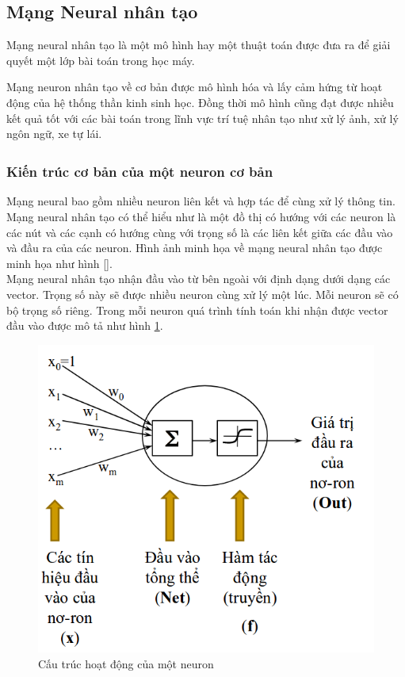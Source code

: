 \documentclass[fontsize=12pt]{scrartcl}
\begin{document}
\subsection{Mạng Neural nhân tạo}\label{subsec:basic_neural}
Mạng neural nhân tạo là một mô hình hay một thuật toán được đưa ra để giải quyết một lớp bài toán trong học máy.
\par
Mạng neuron nhân tạo về cơ bản được mô hình hóa và lấy cảm hứng từ hoạt động của hệ thống thần kinh sinh học. Đồng thời mô hình cũng đạt được nhiều kết quả tốt với các bài toán trong lĩnh vực trí tuệ nhân tạo như xử lý ảnh, xử lý ngôn ngữ, xe tự lái.
\subsubsection{Kiến trúc cơ bản của một neuron cơ bản\textsuperscript{\cite{khoattq}}}\label{subsubsec:basic_neuron}
Mạng neural bao gồm nhiều neuron liên kết và hợp tác để cùng xử lý thông tin. Mạng neural nhân tạo có thể hiểu như là một đồ thị có hướng với các neuron là các nút và các cạnh có hướng cùng với trọng số là các liên kết giữa các đầu vào và đầu ra của các neuron. Hình ảnh minh họa về mạng neural nhân tạo được minh họa như hình \ref{}.\\
Mạng neural nhân tạo nhận đầu vào từ bên ngoài với định dạng dưới dạng các vector. Trọng số này sẽ được nhiều neuron cùng xử lý một lúc. Mỗi neuron sẽ có bộ trọng số riêng. Trong mỗi neuron quá trình tính toán khi nhận được vector đầu vào được mô tả như hình \ref{fig:neuron}. 
\begin{figure}
     \includegraphics[width=\textwidth]{img/neuron}
      \caption{Cấu trúc hoạt động của một neuron}
       \label{fig:neuron}
\end{figure}
\end{document}
